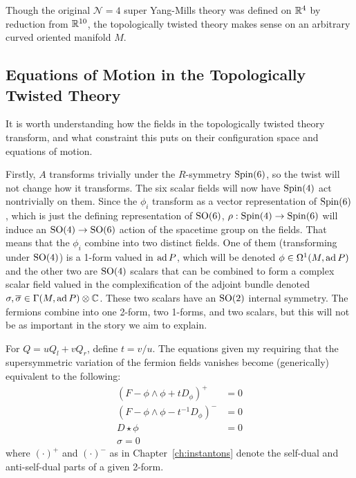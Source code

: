 	\begin{nb}
		Though the original $\mathcal N=4$ super Yang-Mills theory was defined on $\mathbb{R}^4$ by reduction from $\mathbb{R}^{10}$, the topologically twisted theory makes sense on an arbitrary curved oriented manifold $M$.
	\end{nb}
	

\subsection{Equations of Motion in the Topologically Twisted Theory} %
\label{sub:equations_of_motion_in_the_topologically_twisted_theory}

	It is worth understanding how the fields in the topologically twisted theory transform, and what constraint this puts on their configuration space and equations of motion. 

	Firstly, $A$ transforms trivially under the $R$-symmetry $\mathrm{Spin}(6)$, so the twist will not change how it transforms. The six scalar fields will now have $\mathrm{Spin}(4)$ act nontrivially on them. Since the $\phi_i$ transform as a vector representation of $\mathrm{Spin}(6)$, which is just the defining representation of $\mathrm{SO}(6)$, $\rho: \mathrm{Spin}(4) \to \mathrm{Spin}(6)$ will induce an $\mathrm{SO}(4) \to \mathrm{SO}(6)$ action of the spacetime group on the fields. That means that the $\phi_i$ combine into two distinct fields. One of them (transforming under $\mathrm{SO}(4)$) is a 1-form valued in $\mathrm{ad}\, P$, which will be denoted $\phi \in \Omega^1 (M, \mathrm{ad}\, P)$ and the other two are $\mathrm{SO}(4)$ scalars that can be combined to form a complex scalar field valued in the complexification of the adjoint bundle denoted $\sigma, \overline \sigma \in \Gamma(M, \mathrm{ad}\, P) \otimes \mathbb{C}$. These two scalars have an $\mathrm{SO}(2)$ internal symmetry. The fermions combine into one 2-form, two 1-forms, and two scalars, but this will not be as important in the story we aim to explain.
	
	For $Q = u Q_l + v Q_r$, define $t = v/u$. The equations given my requiring that the supersymmetric variation of the fermion fields vanishes become (generically) equivalent to the following:
	\begin{equation}
		\begin{aligned}
			(F - \phi \wedge \phi + t D_\phi)^+ &= 0\\
			(F - \phi \wedge \phi - t^{-1} D_\phi)^- &= 0\\
			D \star \phi &= 0\\
			\sigma = 0
		\end{aligned}
	\end{equation}
	where $(\cdot)^+$ and $(\cdot)^-$ as in Chapter~\ref{ch:instantons} denote the self-dual and anti-self-dual parts of a given 2-form. 
	
